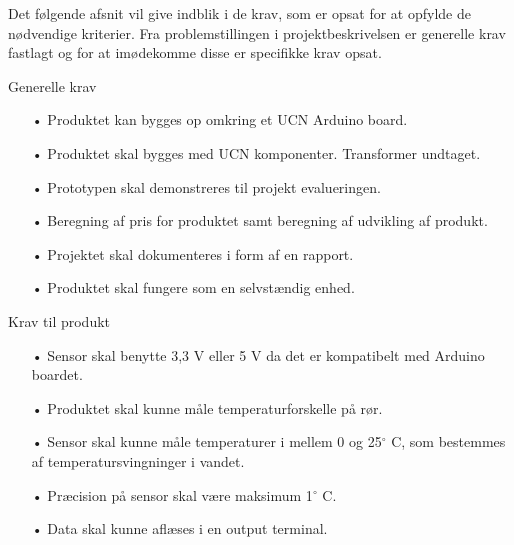 Det følgende afsnit vil give indblik i de krav, som er opsat for at opfylde de nødvendige kriterier. Fra problemstillingen i projektbeskrivelsen er generelle krav fastlagt og for at imødekomme disse er specifikke krav opsat.  

\hfill \break
Generelle krav
\begin{enumerate}
	\item[•]Produktet kan bygges op omkring et UCN Arduino board. 
	\item[•]Produktet skal bygges med UCN komponenter. Transformer undtaget.
	\item[•]Prototypen skal demonstreres til projekt evalueringen. 
	\item[•]Beregning af pris for produktet samt beregning af udvikling af       produkt.
	\item[•]Projektet skal dokumenteres i form af en rapport.
	\item[•]Produktet skal fungere som en selvstændig enhed.
\end{enumerate}	

Krav til produkt
\begin{enumerate}
	\item[•]Sensor skal benytte 3,3 V eller 5 V da det er kompatibelt med Arduino boardet.
	\item[•]Produktet skal kunne måle temperaturforskelle på rør.
	\item[•]Sensor skal kunne måle temperaturer i mellem 0 og 25$^{\circ}$ C, som bestemmes af temperatursvingninger i vandet.
	\item[•]Præcision på sensor skal være maksimum 1$^{\circ}$ C.
	\item[•]Data skal kunne aflæses i en output terminal.
\end{enumerate}	
	